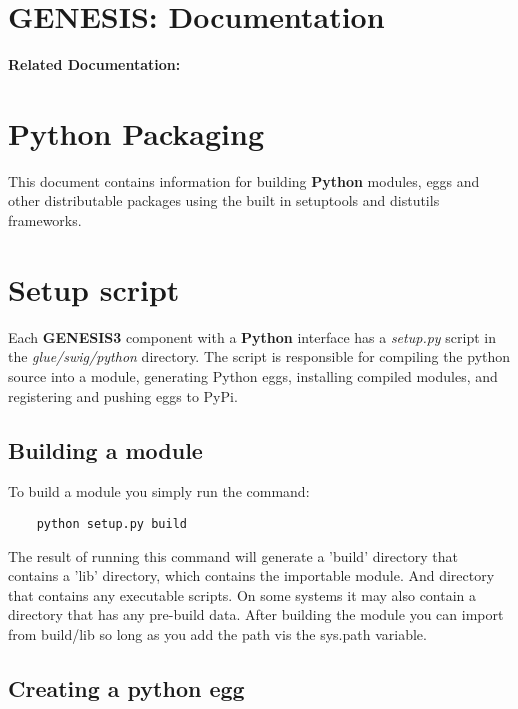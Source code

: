 \documentclass[12pt]{article}
\begin{document}
\section*{GENESIS: Documentation}

{\bf Related Documentation:}

\section*{Python Packaging}

This document contains information for building {\bf Python} modules, eggs and other distributable packages using the built in setuptools and distutils frameworks.  



\section*{Setup script}

	Each {\bf GENESIS3} component with a {\bf Python} interface has a {\it setup.py} script in the {\it glue/swig/python} directory. The script is responsible for compiling the python source into a module, generating Python eggs, installing compiled modules, and registering and pushing eggs to PyPi. 


\subsection*{Building a module}

	To build a module you simply run the command:
	
\begin{verbatim}
	python setup.py build
\end{verbatim}

The result of running this command will generate a 'build' directory that contains a 'lib' directory, which contains the importable module. And directory that contains any executable scripts. On some systems it may also contain a directory that has any pre-build data. After building the module you can import from build/lib so long as you add the path vis the sys.path variable. 

\subsection*{Creating a python egg}
\end{document}
